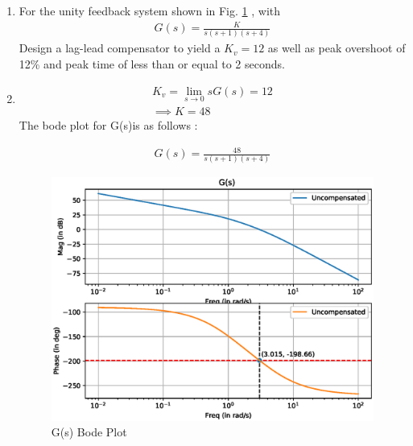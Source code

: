 \begin{enumerate}[label=\thesection.\arabic*.,ref=\thesection.\theenumi]

\item
For the unity feedback system shown in Fig. \ref{fig:ee18btech11049_block_1} , with 
\begin{align}
    G(s) = \frac{K}{s(s+1)(s+4)}
\end{align}
Design a lag-lead
compensator to yield a  $K_{v} = 12$ as well as peak overshoot
of 12\% and peak time of less than or equal to 2 seconds.
\begin{figure}[!ht]
\begin{center}
\end{center}
    \caption{}
    \label{fig:ee18btech11049_block_1}
\end{figure}

\item
\solution

\begin{align}
    K_{v} = \lim_{s \to 0} s G(s) = 12\\
    \implies K = 48
\end{align}
The bode plot for G(s)is as follows : 

\begin{align}
    G(s) = \frac{48}{s(s+1)(s+4)}
\end{align}

\begin{figure}[!h]
    \centering
    \includegraphics[width=\columnwidth]{./figs/ee18btech11049/ee18btech11049_1.eps}
    \caption{G(s) Bode Plot}
    \label{fig:ee18btech11049_1}
\end{figure}


\end{enumerate}
